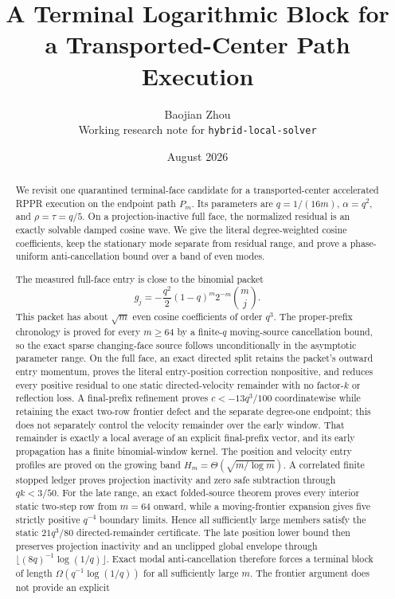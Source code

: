 \documentclass[11pt]{article}
\title{A Terminal Logarithmic Block for a Transported-Center Path Execution}
\author{Baojian Zhou\\
\small Working research note for \texttt{hybrid-local-solver}}
\date{August 2026}
\begin{document}
\maketitle

\begin{abstract}
We revisit one quarantined terminal-face candidate for a transported-center
accelerated RPPR execution on the endpoint path $P_m$.  Its parameters are
$q=1/(16m)$, $\alpha=q^2$, and $\rho=\tau=q/5$.  On a projection-inactive
full face, the normalized residual is an exactly solvable damped cosine wave.
We give the literal degree-weighted cosine coefficients, keep the stationary
mode separate from residual range, and prove a phase-uniform
anti-cancellation bound over a band of even modes.

The measured full-face entry is close to the binomial packet
\[
 g_j=-\frac{q^2}{2}(1-q)^m2^{-m}\binom mj.
\]
This packet has about $\sqrt m$ even cosine coefficients of order $q^3$.
The proper-prefix chronology is proved for every $m\ge64$ by a finite-$q$
moving-source cancellation bound, so the exact sparse changing-face source
follows unconditionally in the asymptotic parameter range.  On the full face,
an exact directed split retains the packet's outward entry momentum, proves
the literal entry-position correction nonpositive, and reduces every positive
residual to one static directed-velocity remainder with no factor-$k$ or
reflection loss.  A final-prefix refinement proves $c<-13q^3/100$
coordinatewise while retaining the exact two-row frontier defect and the
separate degree-one endpoint; this does not separately control the velocity
remainder over the early window.  That remainder is exactly a local average of an explicit
final-prefix vector, and its early propagation has a finite binomial-window
kernel.  The position and velocity entry profiles are proved on the growing
band $H_m=\Theta(\sqrt{m/\log m})$.  A correlated finite stopped ledger
proves projection inactivity and zero safe subtraction through $qk<3/50$.
For the late range, an exact folded-source theorem proves every interior
static two-step row from $m=64$ onward, while a moving-frontier expansion
gives five strictly positive $q^{-4}$ boundary limits.  Hence all sufficiently
large members satisfy the static $21q^3/80$ directed-remainder certificate.
The late position lower bound then preserves projection inactivity and an
unclipped global envelope through
$\lfloor(8q)^{-1}\log(1/q)\rfloor$.  Exact modal anti-cancellation therefore
forces a terminal block of length $\Omega(q^{-1}\log(1/q))$ for all
sufficiently large $m$.  The frontier argument does not provide an explicit

\end{abstract}
\end{document}
